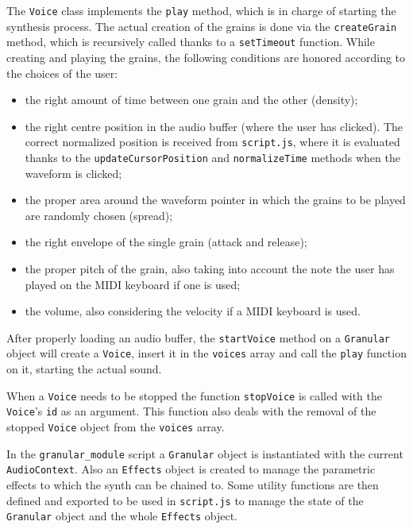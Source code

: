 \documentclass[12pt, a4paper]{article}
\begin{document}
The \texttt{Voice} class implements the \texttt{play} method, which is in charge of starting the synthesis process. The actual creation of the grains is done via the \texttt{createGrain} method, which is recursively called thanks to a \texttt{setTimeout} function. While creating and playing the grains, the following conditions are honored according to the choices of the user:
\begin{itemize}
    \item the right amount of time between one grain and the other (density);
    \item the right centre position in the audio buffer (where the user has clicked). The correct normalized position is received from \texttt{script.js}, where it is evaluated thanks to the \texttt{updateCursorPosition} and \texttt{normalizeTime} methods when the waveform is clicked;
    \item the proper area around the waveform pointer in which the grains to be played
    are randomly chosen (spread);
    \item the right envelope of the single grain (attack and release);
    \item the proper pitch of the grain, also taking into account the note the user has played on the MIDI keyboard if one is used;
    \item the volume, also considering the velocity if a MIDI keyboard is used.
\end{itemize}

After properly loading an audio buffer, the \texttt{startVoice} method on a \texttt{Granular} object will create a \texttt{Voice}, insert it in the \texttt{voices} array and call the \texttt{play} function on it, starting the actual sound.

When a \texttt{Voice} needs to be stopped the function \texttt{stopVoice} is called with the \texttt{Voice}'s \texttt{id} as an argument. This function also deals with the removal of the stopped \texttt{Voice} object from the \texttt{voices} array.

In the \texttt{granular\_module} script a \texttt{Granular} object is instantiated with the current \texttt{AudioContext}. Also an \texttt{Effects} object is created to manage the parametric effects to which the synth can be chained to.\newline
Some utility functions are then defined and exported to be used in \texttt{script.js} to manage the state of the \texttt{Granular} object and the whole \texttt{Effects} object.
\end{document}
